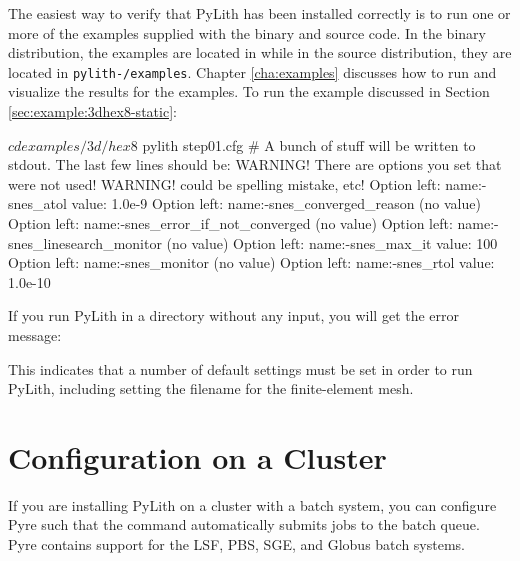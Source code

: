 The easiest way to verify that PyLith has been installed correctly is
to run one or more of the examples supplied with the binary and source
code. In the binary distribution, the examples are located in
 while in the source distribution,
they are located in \texttt{pylith-\pylithVersionNumber/examples}. Chapter
\vref{cha:examples} discusses how to run and visualize the results
for the examples. To run the example discussed in Section
\vref{sec:example:3dhex8-static}:
\begin{shell}
$ cd examples/3d/hex8
$ pylith step01.cfg
# A bunch of stuff will be written to stdout. The last few lines should be:  
WARNING! There are options you set that were not used!
WARNING! could be spelling mistake, etc!
Option left: name:-snes_atol value: 1.0e-9
Option left: name:-snes_converged_reason (no value)
Option left: name:-snes_error_if_not_converged (no value)
Option left: name:-snes_linesearch_monitor (no value)
Option left: name:-snes_max_it value: 100
Option left: name:-snes_monitor (no value)
Option left: name:-snes_rtol value: 1.0e-10
\end{shell}
If you run PyLith in a directory without any input, you will get the
error message:
This indicates that a number of default settings must be set in order
to run PyLith, including setting the filename for the finite-element
mesh.


\section{Configuration on a Cluster}

If you are installing PyLith on a cluster with a batch system, you can
configure Pyre such that the  command automatically
submits jobs to the batch queue. Pyre contains support for the LSF,
PBS, SGE, and Globus batch systems.


